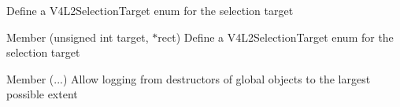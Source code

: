\begin{DoxyRefList}
%
Define a V4\+L2\+Selection\+Target enum for the selection target 
\item[Member \doxylink{classlibcamera_1_1V4L2VideoDevice_aa9eba638ac570ac4746017c6f10fafaa}{libcamera\+::V4\+L2\+Video\+Device\+::set\+Selection} (unsigned int target, \doxylink{classlibcamera_1_1Rectangle}{Rectangle} \texorpdfstring{$\ast$}{*}rect)]\label{todo__todo000054}%
%
Define a V4\+L2\+Selection\+Target enum for the selection target 
\item[Member \doxylink{libcamera_2base_2log_8h_a3577749fb48d57a158b8ac1a0b3ab57e}{LOG} (...)]\label{todo__todo000011}%
%
Allow logging from destructors of global objects to the largest possible extent 
\end{DoxyRefList}